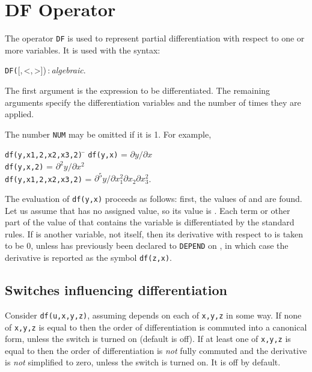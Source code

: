 \section{DF Operator}
\label{sec:DF-operator}
\hypertarget{operator:DF}{}
The operator \texttt{DF} is used to represent partial
differentiation with respect
to one or more variables. It is used with the syntax:
\begin{syntax}
  \texttt{DF(}[,\,<,\,>])\,:\,\textit{algebraic}.
\end{syntax}
The first argument is the expression to be differentiated. The remaining
arguments specify the differentiation variables and the number of times
they are applied.

The number \texttt{NUM} may be omitted if it is 1.  For example,

\begin{tabbing}
\hspace{0.5in} \= \texttt{df(y,x1,2,x2,x3,2)} \= \kill
\> \texttt{df(y,x)} \> = $\partial y/\partial x$ \\
\> \texttt{df(y,x,2)} \> = $\partial^{2}y/\partial x^{2}$ \\
\> \texttt{df(y,x1,2,x2,x3,2)} \> = $\partial^{5}y/\partial x_{1}^{2}
 \partial x_{2}\partial x_{3}^{2}$.
\end{tabbing}

The evaluation of \texttt{df(y,x)} proceeds as follows: first, the values of
 and  are found.  Let us assume that  has no assigned
value, so its value is .  Each term or other part of the value of
 that contains the variable  is differentiated by the
standard rules.  If  is another variable, not  itself, then
its derivative with respect to  is taken to be 0, unless 
has previously been declared to \texttt{DEPEND} on , in which
case the derivative is reported as the symbol \texttt{df(z,x)}.


\subsection{Switches influencing differentiation}
\hypertarget{switch:COMMUTEDF}{}
\hypertarget{switch:NOCOMMUTEDF}{}
\hypertarget{switch:SIMPNONCOMDF}{}

Consider \texttt{df(u,x,y,z)}, assuming  depends on each of \texttt{x,y,z}
in some way.  If none of \texttt{x,y,z} is equal to 
then the order of differentiation is commuted into a canonical form, unless the
switch  is turned on (default is off).
If at least one of \texttt{x,y,z} is equal to  then the order of
differentiation is \emph{not} fully commuted and the derivative is \emph{not}
simplified
to zero, unless the switch  is turned on.
It is off by default.

